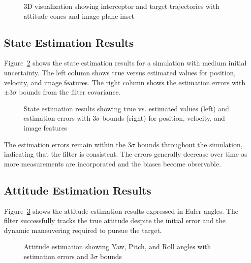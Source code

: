 \documentclass[11pt,a4paper]{article}
\begin{document}
\begin{figure}[h]
    \centering
    \caption{3D visualization showing interceptor and target trajectories with attitude cones and image plane inset}
    \label{fig:3d_scenario}
\end{figure}

\subsection{State Estimation Results}

Figure~\ref{fig:state_estimation} shows the state estimation results for a simulation with medium initial uncertainty. The left column shows true versus estimated values for position, velocity, and image features. The right column shows the estimation errors with $\pm 3\sigma$ bounds from the filter covariance.

\begin{figure}[h]
    \centering
    \caption{State estimation results showing true vs. estimated values (left) and estimation errors with $3\sigma$ bounds (right) for position, velocity, and image features}
    \label{fig:state_estimation}
\end{figure}

The estimation errors remain within the $3\sigma$ bounds throughout the simulation, indicating that the filter is consistent. The errors generally decrease over time as more measurements are incorporated and the biases become observable.

\subsection{Attitude Estimation Results}

Figure~\ref{fig:attitude_estimation} shows the attitude estimation results expressed in Euler angles. The filter successfully tracks the true attitude despite the initial error and the dynamic maneuvering required to pursue the target.

\begin{figure}[h]
    \centering
    \caption{Attitude estimation showing Yaw, Pitch, and Roll angles with estimation errors and $3\sigma$ bounds}
    \label{fig:attitude_estimation}
\end{figure}
\end{document}

